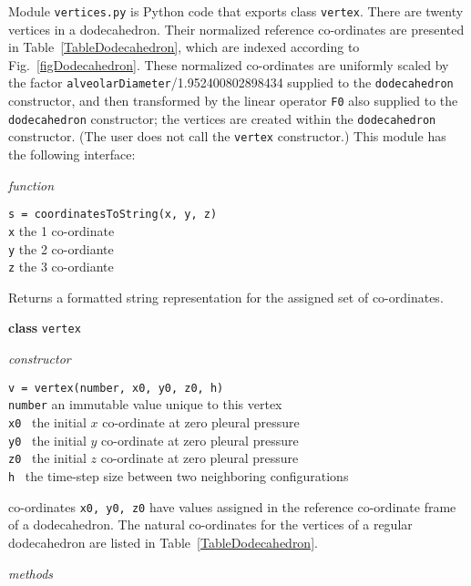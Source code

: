 \label{appVertices}

Module \texttt{vertices.py} is Python code that exports class \texttt{vertex}.  There are twenty vertices in a dodecahedron.  Their normalized reference co-ordinates are presented in Table~\ref{TableDodecahedron}, which are indexed according to Fig.~\ref{figDodecahedron}.  These normalized co-ordinates are uniformly scaled by the factor \texttt{alveolarDiameter}/1.952400802898434 supplied to the \texttt{dodecahedron} constructor, and then transformed by the linear operator \texttt{F0} also supplied to the \texttt{dodecahedron} constructor; the vertices are created within the \texttt{dodecahedron} constructor.  (The user does not call the \texttt{vertex} constructor.)  This module has the following interface:

\medskip\noindent
\textit{function}

\medskip\noindent
\texttt{s = coordinatesToString(x, y, z)} \\
\indent \texttt{x} \; the 1 co-ordinate \\
\indent \texttt{y} \; the 2 co-ordiante \\
\indent \texttt{z} \; the 3 co-ordiante 

\medskip\noindent
Returns a formatted string representation for the assigned set of co-ordinates.

\bigskip\noindent
\textbf{class} \texttt{vertex}

\medskip\noindent
\textit{constructor}

\medskip\noindent
\texttt{v = vertex(number, x0, y0, z0, h)} \\
\indent \texttt{number} \; an immutable value unique to this vertex \\
\indent \texttt{x0} \qquad\;\, the initial $x$ co-ordinate at zero pleural pressure \\
\indent \texttt{y0} \qquad\;\, the initial $y$ co-ordinate at zero pleural pressure \\
\indent \texttt{z0} \qquad\;\, the initial $z$ co-ordinate at zero pleural pressure \\
\indent \texttt{h\phantom{0}} \qquad\;\, the time-step size between two neighboring configurations

\medskip\noindent
co-ordinates \texttt{x0, y0, z0} have values assigned in the reference co-ordinate frame of a dodecahedron.  The natural co-ordinates for the vertices of a regular dodecahedron are listed in Table~\ref{TableDodecahedron}.

\medskip\noindent
\textit{methods}

